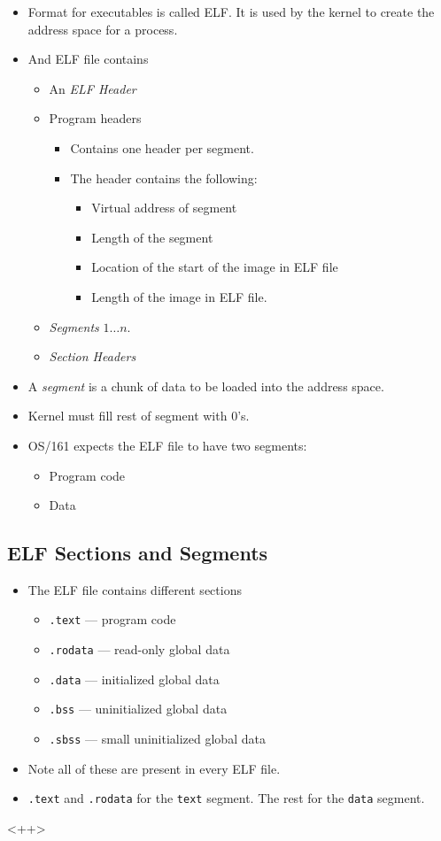 \documentclass[12pt]{article}
\begin{document}
\begin{itemize}
	\item Format for executables is called ELF. It is used by the kernel to
		create the address space for a process.
	\item And ELF file contains
		\begin{itemize}
			\item An \emph{ELF Header}
			\item Program headers
				\begin{itemize}
					\item Contains one header per segment.
					\item The header contains the following:
						\begin{itemize}
							\item Virtual address of segment
							\item Length of the segment
							\item Location of the start of the image in ELF file
							\item Length of the image in ELF file.
						\end{itemize}
				\end{itemize}
			\item \emph{Segments} $1\dots n$.
			\item \emph{Section Headers}
		\end{itemize}
	\item A \emph{segment} is a chunk of data to be loaded into the address
		space.
	\item Kernel must fill rest of segment with 0's.
	\item OS/161 expects the ELF file to have two segments:
		\begin{itemize}
			\item Program code
			\item Data
		\end{itemize}
\end{itemize}

\subsection{ELF Sections and Segments}

\begin{itemize}
	\item The ELF file contains different sections
		\begin{itemize}
			\item \texttt{.text} --- program code
			\item \texttt{.rodata} --- read-only global data
			\item \texttt{.data} --- initialized global data
			\item \texttt{.bss} --- uninitialized global data
			\item \texttt{.sbss} --- small uninitialized global data
		\end{itemize}
	\item Note all of these are present in every ELF file.
	\item \texttt{.text} and \texttt{.rodata} for the \texttt{text} segment. The
		rest for the \texttt{data} segment.
\end{itemize}<++>
\end{document}
